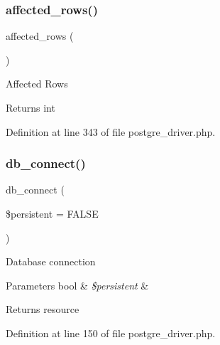 \mbox{\label{class_c_i___d_b__postgre__driver_a77248aaad33eb132c04cc4aa3f4bc8cb}} 
\subsubsection{\texorpdfstring{affected\_rows()}{affected\_rows()}}
{\footnotesize\ttfamily affected\+\_\+rows (\begin{DoxyParamCaption}{ }\end{DoxyParamCaption})}

Affected Rows

\begin{DoxyReturn}{Returns}
int 
\end{DoxyReturn}


Definition at line 343 of file postgre\+\_\+driver.\+php.

\mbox{\label{class_c_i___d_b__postgre__driver_a52bf595e79e96cc0a7c907a9b45aeb4d}} 
\subsubsection{\texorpdfstring{db\_connect()}{db\_connect()}}
{\footnotesize\ttfamily db\+\_\+connect (\begin{DoxyParamCaption}\item[{}]{\$persistent = {\ttfamily FALSE} }\end{DoxyParamCaption})}

Database connection


\begin{DoxyParams}[1]{Parameters}
bool & {\em \$persistent} & \\
\hline
\end{DoxyParams}
\begin{DoxyReturn}{Returns}
resource 
\end{DoxyReturn}


Definition at line 150 of file postgre\+\_\+driver.\+php.

\mbox{\label{class_c_i___d_b__postgre__driver_a43b8d30b879d4f09ceb059b02af2bc02}} 
